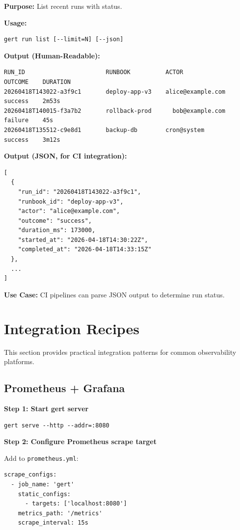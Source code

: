 \textbf{Purpose:} List recent runs with status.

\textbf{Usage:}
\begin{verbatim}
gert run list [--limit=N] [--json]
\end{verbatim}

\textbf{Output (Human-Readable):}
\begin{verbatim}
RUN_ID                       RUNBOOK          ACTOR                OUTCOME    DURATION
20260418T143022-a3f9c1       deploy-app-v3    alice@example.com    success    2m53s
20260418T140015-f3a7b2       rollback-prod      bob@example.com      failure    45s
20260418T135512-c9e8d1       backup-db        cron@system          success    3m12s
\end{verbatim}

\textbf{Output (JSON, for CI integration):}
\begin{verbatim}
[
  {
    "run_id": "20260418T143022-a3f9c1",
    "runbook_id": "deploy-app-v3",
    "actor": "alice@example.com",
    "outcome": "success",
    "duration_ms": 173000,
    "started_at": "2026-04-18T14:30:22Z",
    "completed_at": "2026-04-18T14:33:15Z"
  },
  ...
]
\end{verbatim}

\textbf{Use Case:} CI pipelines can parse JSON output to determine run status.

\section{Integration Recipes}

This section provides practical integration patterns for common observability platforms.

\subsection{Prometheus + Grafana}

\textbf{Step 1: Start gert server}
\begin{verbatim}
gert serve --http --addr=:8080
\end{verbatim}

\textbf{Step 2: Configure Prometheus scrape target}

Add to \texttt{prometheus.yml}:
\begin{verbatim}
scrape_configs:
  - job_name: 'gert'
    static_configs:
      - targets: ['localhost:8080']
    metrics_path: '/metrics'
    scrape_interval: 15s
\end{verbatim}

